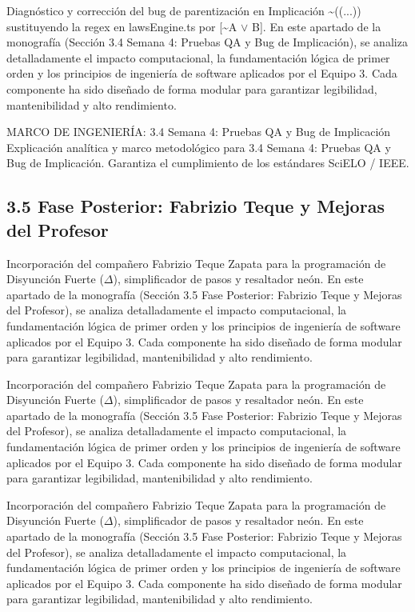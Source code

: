 \documentclass[11pt,a4paper]{article}
\begin{document}
Diagnóstico y corrección del bug de parentización en Implicación
\textasciitilde{}((...)) sustituyendo la regex en lawsEngine.ts por [\textasciitilde{}A $ \lor $ B]. En este
apartado de la monografía (Sección 3.4 Semana 4: Pruebas QA y Bug de
Implicación), se analiza detalladamente el impacto computacional, la
fundamentación lógica de primer orden y los principios de ingeniería de
software aplicados por el Equipo 3. Cada componente ha sido diseñado de
forma modular para garantizar legibilidad, mantenibilidad y alto
rendimiento.

\medskip\hrulefill\medskip
 MARCO DE INGENIERÍA: 3.4 Semana 4: Pruebas QA y Bug de Implicación
Explicación analítica y marco metodológico para 3.4 Semana 4: Pruebas
QA y Bug de Implicación. Garantiza el cumplimiento de los estándares
SciELO / IEEE.
\medskip\hrulefill\medskip

\medskip\hrulefill\medskip

\subsection{3.5 Fase Posterior: Fabrizio Teque y Mejoras del Profesor}

Incorporación del compañero Fabrizio Teque Zapata para la programación
de Disyunción Fuerte ($ \Delta $), simplificador de pasos y resaltador neón. En
este apartado de la monografía (Sección 3.5 Fase Posterior: Fabrizio
Teque y Mejoras del Profesor), se analiza detalladamente el impacto
computacional, la fundamentación lógica de primer orden y los principios
de ingeniería de software aplicados por el Equipo 3. Cada componente ha
sido diseñado de forma modular para garantizar legibilidad,
mantenibilidad y alto rendimiento.

Incorporación del compañero Fabrizio Teque Zapata para la programación
de Disyunción Fuerte ($ \Delta $), simplificador de pasos y resaltador neón. En
este apartado de la monografía (Sección 3.5 Fase Posterior: Fabrizio
Teque y Mejoras del Profesor), se analiza detalladamente el impacto
computacional, la fundamentación lógica de primer orden y los principios
de ingeniería de software aplicados por el Equipo 3. Cada componente ha
sido diseñado de forma modular para garantizar legibilidad,
mantenibilidad y alto rendimiento.

Incorporación del compañero Fabrizio Teque Zapata para la programación
de Disyunción Fuerte ($ \Delta $), simplificador de pasos y resaltador neón. En
este apartado de la monografía (Sección 3.5 Fase Posterior: Fabrizio
Teque y Mejoras del Profesor), se analiza detalladamente el impacto
computacional, la fundamentación lógica de primer orden y los principios
de ingeniería de software aplicados por el Equipo 3. Cada componente ha
sido diseñado de forma modular para garantizar legibilidad,
mantenibilidad y alto rendimiento.
\end{document}
